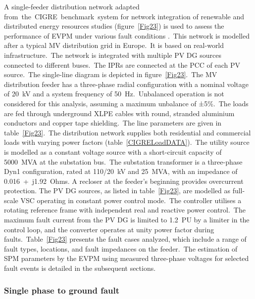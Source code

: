 A single-feeder distribution network adapted from~the~CIGRE~benchmark~system for network integration of renewable and distributed energy resources studies (figure~\ref{Fig23}) is used to assess the performance of EVPM under various fault conditions \cite{cigrebenchmark}.~This network is modelled after a typical MV distribution grid in Europe.~It is based on real-world infrastructure.~The network is integrated with multiple PV DG sources connected to different buses.~The IPRs are connected at the PCC of each PV source.~The single-line diagram is depicted in figure~\ref{Fig23}.~The MV distribution feeder has a three-phase radial configuration with a nominal voltage of 20~kV and a system frequency of 50~Hz.~Unbalanced operation is not considered for this analysis, assuming a maximum unbalance of ±5\%.~The loads are fed through underground XLPE cables with round, stranded aluminium conductors and copper tape shielding.~The line parameters are given in table~\ref{Fig23}.~The distribution network supplies both residential and commercial loads with varying power factors (table~\ref{CIGRELoadDATA}).~The utility source is modelled as a constant voltage source with a short-circuit capacity of 5000~MVA at the substation bus.~The substation transformer is a three-phase Dyn1 configuration, rated at 110/20~kV and 25~MVA, with an impedance of 0.016~+~j1.92~Ohms. A recloser at the feeder's beginning provides overcurrent protection. The PV DG sources, as listed in table~\ref{Fig23}, are modelled as full-scale VSC operating in constant power control mode.~The controller utilises a rotating reference frame with independent real and reactive power control.~The maximum fault current from the PV DG is limited to 1.2~PU by a limiter in the control loop, and the converter operates at unity power factor during faults.~Table~\ref{Fig23} presents the fault cases analyzed, which include a range of fault types, locations, and fault impedances on the feeder.~The estimation of SPM parameters by the EVPM using measured three-phase voltages for selected fault events is detailed in the subsequent sections.


\subsubsection{Single phase to ground fault}

